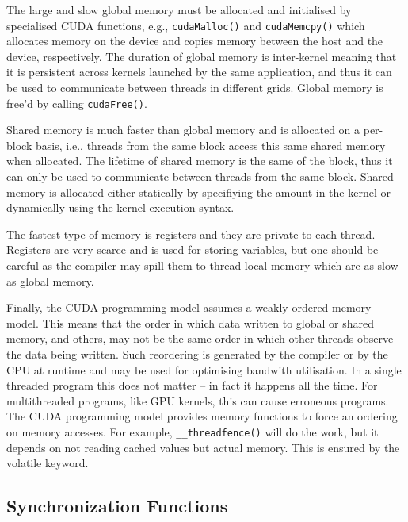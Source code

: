 The large and slow global memory must be allocated and
initialised by specialised CUDA functions, e.g.,
\texttt{cudaMalloc()} and \texttt{cudaMemcpy()} which
allocates memory on the device and copies memory between the
host and the device, respectively. The duration of global
memory is inter-kernel meaning that it is persistent across
kernels launched by the same application, and thus it can be
used to communicate between threads in different
grids. Global memory is free'd by calling
\texttt{cudaFree()}.

Shared memory is much faster than global memory and is
allocated on a per-block basis, i.e., threads from the same
block access this same shared memory when allocated. The
lifetime of shared memory is the same of the block, thus it
can only be used to communicate between threads from the
same block. Shared memory is allocated either statically by
specifiying the amount in the kernel or dynamically using
the kernel-execution syntax.

The fastest type of memory is registers and they are private
to each thread. Registers are very scarce and is used for
storing variables, but one should be careful as the compiler
may spill them to thread-local memory which are as slow as
global memory.

Finally, the CUDA programming model assumes a weakly-ordered
memory model. This means that the order in which data
written to global or shared memory, and others, may not be
the same order in which other threads observe the data being
written. Such reordering is generated by the compiler or by
the CPU at runtime and may be used for optimising bandwith
utilisation.  In a single threaded program this does not
matter -- in fact it happens all the time. For multithreaded
programs, like GPU kernels, this can cause erroneous
programs. The CUDA programming model provides memory
functions to force an ordering on memory accesses. For
example, \texttt{\_\_threadfence()} will do the work, but it
depends on not reading cached values but actual memory. This
is ensured by the volatile keyword. 


\subsection{Synchronization Functions}

